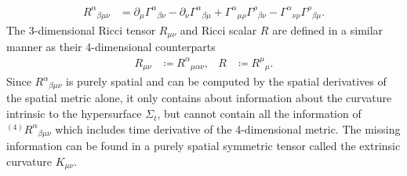 \begin{align}
    R^{\alpha}{}_{\beta\mu\nu} &= \partial_{\mu} \Gamma^{\alpha}{}_{\beta\nu} - \partial_{\nu} \Gamma^{\alpha}{}_{\beta\mu} + \Gamma^{\alpha}{}_{\mu\rho}\Gamma^{\rho}{}_{\beta\nu} - \Gamma^{\alpha}{}_{\nu\rho}\Gamma^{\rho}{}_{\beta\mu}.
\end{align}
The 3-dimensional Ricci tensor $R_{\mu\nu}$ and Ricci scalar $R$ are defined in a similar manner as their 4-dimensional counterparts
\begin{align}
     R_{\mu\nu} &\coloneqq  R^\alpha{}_{\mu\alpha\nu}, & R &\coloneqq  R^{\mu}{}_{\mu}.
\end{align}
Since $R^{\alpha}{}_{\beta\mu\nu}$ is purely spatial and can be computed by the spatial derivatives of the spatial metric alone,
it only contains about information about the curvature intrinsic to the hypersurface $\Sigma_t$,
but cannot contain all the information of ${}^{(4)} R^{\alpha}{}_{\beta\mu\nu}$ which includes time derivative of the 4-dimensional metric.
The missing information can be found in a purely spatial symmetric tensor called the extrinsic curvature $K_{\mu\nu}$.

